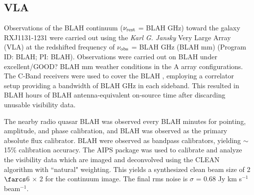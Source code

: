 \documentclass[]{emulateapj}
\begin{document}
\subsection{VLA} 
Observations of the BLAH continuum ($\nu_{\rm rest}$ = BLAH GHz) toward the
galaxy RXJ1131-1231 were carried out using the {\it Karl G. Jansky} Very Large 
Array (VLA) at the redshifted frequency of $\nu_{\rm obs}$ = BLAH GHz (BLAH mm)
(Program ID: BLAH; PI: BLAH).
Observations were carried out on BLAH under excellent/GOOD? BLAH mm weather
conditions in the A array configurations. The C-Band receivers were used to 
cover the BLAH
, employing a correlator setup providing a bandwidth of BLAH GHz in each
sideband. This resulted in BLAH hours of BLAH antenna-equivalent on-source time
after 
discarding unusable visibility data.

The nearby radio quasar BLAH was observed every BLAH minutes for
pointing, amplitude, and phase calibration, and BLAH was observed as the
primary
absolute flux calibrator. BLAH were observed as bandpass calibrators, yielding
$\sim
$15\% calibration accuracy.
The AIPS package was used to calibrate and analyze the visibility data which
are imaged and deconvolved using
the CLEAN algorithm with ``natural" weighting. This yields a synthesized clean
beam size of 2$\farcs$6 $\times$ 2 for the continuum image. The final
rms 
noise is $\sigma$ = 0.68 Jy km s$^{-1}$ beam$^{-1}$.
\end{document}
